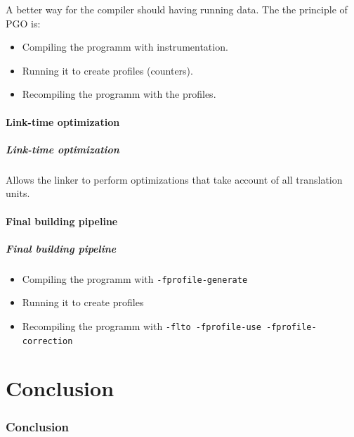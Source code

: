 \documentclass{beamer}
\begin{document}
    \begin{frame}
        A better way for the compiler should having running data.
        The the principle of PGO is:
        \begin{itemize}
            \item Compiling the programm with instrumentation.
            \item Running it to create profiles (counters).
            \item Recompiling the programm with the profiles.
        \end{itemize}
    \end{frame}
    \subsection{Link-time optimization}

    \begin{frame}
        \frametitle{Link-time optimization}

        Allows the linker to perform optimizations that take account of all translation units.
    \end{frame}

    \subsection{Final building pipeline}

    \begin{frame}[fragile]
        \frametitle{Final building pipeline}

        \begin{itemize}
            \item Compiling the programm with \verb'-fprofile-generate'
            \item Running it to create profiles
            \item Recompiling the programm with \verb'-flto -fprofile-use -fprofile-correction'
        \end{itemize}
    \end{frame}

\part{Conclusion}
\section*{Conclusion}
\end{document}
